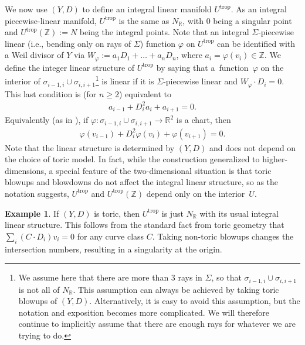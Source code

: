 \documentclass[pdftex]{sigma}
\numberwithin{equation}{section}
\numberwithin{figure}{section}
\numberwithin{table}{section}
\DeclareMathOperator{\trop}{trop}
\let\bb=\mathbb
\let\rar=\rightarrow
\theoremstyle{definition}
\newtheorem{eg}[thm]{Example}
\begin{document}
We now use $(Y,D)$ to define an integral linear manifold $U^{\trop}$. As an integral piecewise-linear manifold, $U^{\trop}$ is the same as $N_{\bb{R}}$, with $0$ being a singular point and $U^{\trop}(\bb{Z}):=N$ being the integral points.
 Note that an integral $\Sigma$-piecewise linear (i.e., bending only on rays of $\Sigma$) function $\varphi$ on $U^{\trop}$ can be identified with a Weil divisor of $Y$ via $W_{\varphi}:=a_1D_1+\dots + a_n D_n$, where $a_i = \varphi(v_i)\in \bb{Z}$. We define the integer linear structure of $U^{\trop}$ by saying that a~func\-tion~$\varphi$ on the interior of $\sigma_{i-1,i}\cup\sigma_{i,i+1}$\footnote{We assume here that there are more than $3$ rays in $\Sigma$, so that $\sigma_{i-1,i}\cup \sigma_{i,i+1}$ is not all of $N_{\bb{R}}$. This assumption can always be achieved by taking toric blowups of $(Y,D)$. Alternatively, it is easy to avoid this assumption, but the notation and exposition becomes more complicated. We will therefore continue to implicitly assume that there are enough rays for whatever we are trying to do.} is linear if it is $\Sigma$-piecewise linear and $W_\varphi \cdot D_{i} = 0$. This last condition is (for $n\geq 2$) equivalent to
\begin{gather*}
	a_{i-1} +D_{i}^2 a_{i} + a_{i+1} = 0.
\end{gather*}
Equivalently (as in \cite{GHK1}), if $\varphi\colon \sigma_{i-1,i}\cup \sigma_{i,i+1}\rar \bb{R}^2$ is a chart, then
\begin{gather} \label{linear}
	\varphi(v_{i-1})+D_{i}^2 \varphi(v_i) + \varphi(v_{i+1}) = 0.
\end{gather}
Note that the linear structure is determined by $(Y,D)$ and does not depend on the choice of toric model. In fact, while the construction generalized to higher-dimensions, a special feature of the two-dimensional situation is that toric blowups and blowdowns do not affect the integral linear structure, so as the notation suggests, $U^{\trop}$ and $U^{\trop}(\bb{Z})$ depend only on the interior~$U$.

\begin{eg}
If $(Y,D)$ is toric, then $U^{\trop}$ is just $N_{\bb{R}}$ with its usual integral linear structure. This follows from the standard fact from toric geometry that
$
	\sum_i (C \cdot D_i) v_i = 0
$
for any curve class $C$. Taking non-toric blowups changes the intersection numbers, resulting in a singularity at the origin.
\end{eg}
\end{document}
